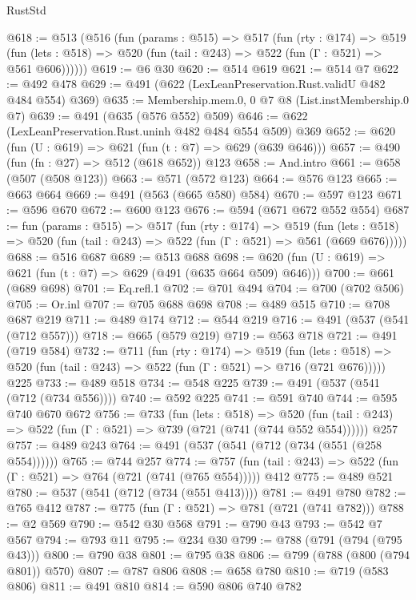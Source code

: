 \begin{lexlean}{RustStd}
\begin{coremodule}
@618 := @513
    (@516
      (fun (params : @515) =>
      @517
        (fun (rty : @174) =>
        @519
          (fun (lets : @518) => @520 (fun (tail : @243) => @522 (fun (Γ : @521) => @561 @606))))))
@619 := @6 @30
@620 := @514 @619
@621 := @514 @7
@622 := @492 @478
@629 := @491 (@622 (LexLeanPreservation.Rust.validU @482 @484 @554) @369)
@635 := Membership.mem.{0, 0} @7 @8 (List.instMembership.{0} @7)
@639 := @491 (@635 (@576 @552) @509)
@646 := @622 (LexLeanPreservation.Rust.uninh @482 @484 @554 @509) @369
@652 := @620 (fun (U : @619) => @621 (fun (t : @7) => @629 (@639 @646)))
@657 := @490 (fun (fn : @27) => @512 (@618 @652)) @123
@658 := And.intro
@661 := @658 (@507 (@508 @123))
@663 := @571 (@572 @123)
@664 := @576 @123
@665 := @663 @664
@669 := @491 (@563 (@665 @580) @584)
@670 := @597 @123
@671 := @596 @670
@672 := @600 @123
@676 := @594 (@671 @672 @552 @554)
@687 := fun (params : @515) =>
  @517
    (fun (rty : @174) =>
    @519
      (fun (lets : @518) => @520 (fun (tail : @243) => @522 (fun (Γ : @521) => @561 (@669 @676)))))
@688 := @516 @687
@689 := @513 @688
@698 := @620 (fun (U : @619) => @621 (fun (t : @7) => @629 (@491 (@635 @664 @509) @646)))
@700 := @661 (@689 @698)
@701 := Eq.refl.{1}
@702 := @701 @494
@704 := @700 (@702 @506)
@705 := Or.inl
@707 := @705 @688 @698
@708 := @489 @515
@710 := @708 @687 @219
@711 := @489 @174
@712 := @544 @219
@716 := @491 (@537 (@541 (@712 @557)))
@718 := @665 (@579 @219)
@719 := @563 @718
@721 := @491 (@719 @584)
@732 := @711
    (fun (rty : @174) =>
    @519
      (fun (lets : @518) => @520 (fun (tail : @243) => @522 (fun (Γ : @521) => @716 (@721 @676)))))
    @225
@733 := @489 @518
@734 := @548 @225
@739 := @491 (@537 (@541 (@712 (@734 @556))))
@740 := @592 @225
@741 := @591 @740
@744 := @595 @740 @670 @672
@756 := @733
    (fun (lets : @518) =>
    @520 (fun (tail : @243) => @522 (fun (Γ : @521) => @739 (@721 (@741 (@744 @552 @554))))))
    @257
@757 := @489 @243
@764 := @491 (@537 (@541 (@712 (@734 (@551 (@258 @554))))))
@765 := @744 @257
@774 := @757 (fun (tail : @243) => @522 (fun (Γ : @521) => @764 (@721 (@741 (@765 @554))))) @412
@775 := @489 @521
@780 := @537 (@541 (@712 (@734 (@551 @413))))
@781 := @491 @780
@782 := @765 @412
@787 := @775 (fun (Γ : @521) => @781 (@721 (@741 @782)))
@788 := @2 @569
@790 := @542 @30 @568
@791 := @790 @43
@793 := @542 @7 @567
@794 := @793 @11
@795 := @234 @30
@799 := @788 (@791 (@794 (@795 @43)))
@800 := @790 @38
@801 := @795 @38
@806 := @799 (@788 (@800 (@794 @801)) @570)
@807 := @787 @806
@808 := @658 @780
@810 := @719 (@583 @806)
@811 := @491 @810
@814 := @590 @806 @740 @782

\end{coremodule}
\end{lexlean}
